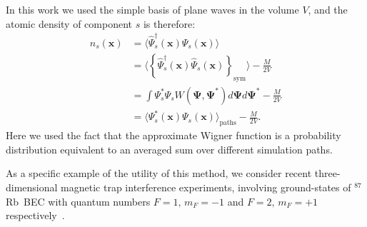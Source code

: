 \documentclass[aps,prl,twocolumn,showpacs,amsmath,amssymb,superscriptaddress]{revtex4-1}
\newcommand{\Rb}{$^{87}$Rb}
\newcommand{\xvec}{\boldsymbol{x}}
\newcommand{\Psivec}{\boldsymbol{\Psi}}
\begin{document}
In this work we used the simple basis of plane waves in the volume $V$,
and the atomic density of component $s$ is therefore:
\begin{equation}
\begin{split}
n_{s} (\xvec) & =
\langle \widehat{\Psi}^\dagger_{s} (\xvec) \widehat{\Psi}_{s} (\xvec) \rangle \\
& = \langle \left\{ \widehat{\Psi}^\dagger_{s} (\xvec)
	\widehat{\Psi}_{s} (\xvec) \right\}_{\mathrm{sym}} \rangle - \frac{M}{2V} \\
& = \int \Psi^*_{s} \Psi_{s} W(\Psivec, \Psivec^*) d\Psivec d\Psivec^* - \frac{M}{2V} \\
& = \langle \Psi^*_{s} (\xvec) \Psi_{s} (\xvec) \rangle_{\mathrm{paths}} - \frac{M}{2V}.
\end{split}
\end{equation}
Here we used the fact that the approximate Wigner function is a probability distribution
equivalent to an averaged sum over different simulation paths.

As a specific example of the utility of this method,
we consider recent three-dimensional magnetic trap interference experiments,
involving ground-states of \Rb~BEC with quantum numbers ${F=1,\, m_{F}=-1}$
and ${F=2,\, m_{F}=+1}$ respectively~\cite{Egorov2010}.
\end{document}
